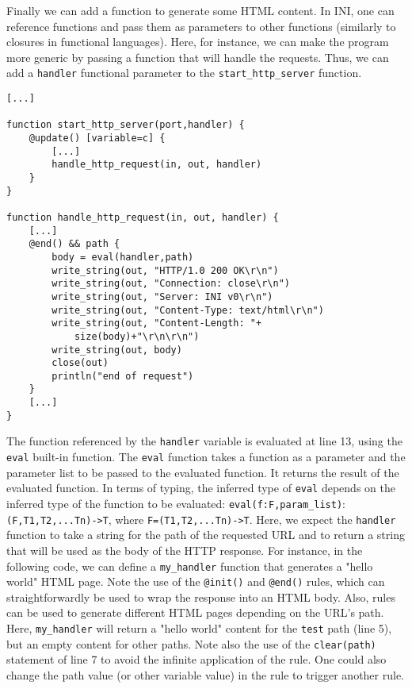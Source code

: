 \documentclass[11pt]{article}
\begin{document}
Finally we can add a function to generate some HTML content. In INI, one can reference functions and pass them as parameters to other functions (similarly to closures in functional languages). Here, for instance, we can make the program more generic by passing a function that will handle the requests. Thus, we can add a \texttt{handler} functional parameter to the \texttt{start\_http\_server} function.

\begin{lstlisting}
[...]

function start_http_server(port,handler) {
	@update() [variable=c] {
		[...]
		handle_http_request(in, out, handler)
	}		
}

function handle_http_request(in, out, handler) {
	[...]
	@end() && path {
		body = eval(handler,path)
		write_string(out, "HTTP/1.0 200 OK\r\n")
		write_string(out, "Connection: close\r\n")
		write_string(out, "Server: INI v0\r\n")
		write_string(out, "Content-Type: text/html\r\n")
		write_string(out, "Content-Length: "+
			size(body)+"\r\n\r\n")
		write_string(out, body)
		close(out)
		println("end of request")		
	}
	[...]
}
\end{lstlisting}

The function referenced by the \texttt{handler} variable is evaluated at line 13, using the \texttt{eval} built-in function. The \texttt{eval} function takes a function as a parameter and the parameter list to be passed to the evaluated function. It returns the result of the evaluated function. In terms of typing, the inferred type of \texttt{eval} depends on the inferred type of the function to be evaluated: \texttt{eval(f:F,param\_list)}:\texttt{(F,T1,T2,...Tn)->T}, where \texttt{F=(T1,T2,...Tn)->T}. Here, we expect the \texttt{handler} function to take a string for the path of the requested URL and to return a string that will be used as the body of the HTTP response. For instance, in the following code, we can define a \texttt{my\_handler} function that generates a "hello world" HTML page. Note the use of the \texttt{@init()} and \texttt{@end()} rules, which can straightforwardly be used to wrap the response into an HTML body. Also, rules can be used to generate different HTML pages depending on the URL's path. Here, \texttt{my\_handler} will return a "hello world" content for the \texttt{test} path (line 5), but an empty content for other paths. Note also the use of the \texttt{clear(path)} statement of line 7 to avoid the infinite application of the rule. One could also change the path value (or other variable value) in the rule to trigger another rule.
\end{document}
